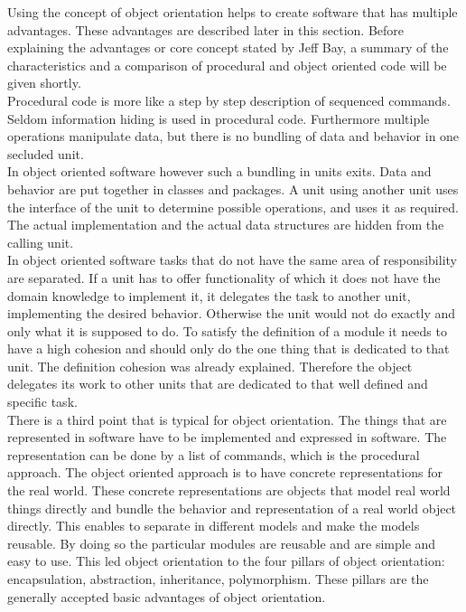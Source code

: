 Using the concept of object orientation helps to create software that has multiple advantages. These advantages are described later in this section. Before explaining the advantages or core concept stated by Jeff Bay, a summary of the characteristics and a comparison of procedural and object oriented code will be given shortly. 
\\

Procedural code is more like a step by step description of sequenced commands. 	Seldom information hiding is used in procedural code. Furthermore multiple operations manipulate data, but there is no bundling of data and behavior in one secluded unit. 
\\

In object oriented software however such a bundling in units exits. Data and behavior are put together in classes and packages. A unit using another unit uses the interface of the unit to determine possible operations, and uses it as required. The actual implementation and the actual data structures are hidden from the calling unit.
\\
 
In object oriented software tasks that do not have the same area of responsibility are separated. If a unit has to offer functionality of which it does not have the domain knowledge to implement it, it delegates the task to another unit, implementing the desired behavior. Otherwise the unit would not do exactly and only what it is supposed to do. To satisfy the definition of a module it needs to have a high cohesion and should only do the one thing that is dedicated to that unit. The definition cohesion was already explained. Therefore the object delegates its work to other units that are dedicated to that well defined and specific task. 
\\

There is a third point that is typical for object orientation. The things that are represented in software have to be implemented and expressed in software. The representation can be done by a list of commands, which is the procedural approach. The object oriented approach is to have concrete representations for the real world. These concrete representations are objects that model real world things directly and bundle the behavior and representation of a real world object directly. 
This enables to separate in different models and make the models reusable. By doing so the particular modules are reusable and are simple and easy to use. 
This led object orientation to the four pillars of object orientation: encapsulation, abstraction, inheritance, polymorphism. These pillars are the generally accepted basic advantages of object orientation. \\

